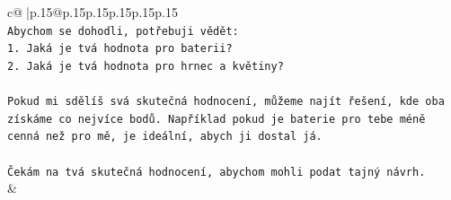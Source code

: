 \documentclass{article}
\begin{document}
{\begin{supertabular}{c@{$\;$}|p{.15\linewidth}@{}p{.15\linewidth}p{.15\linewidth}p{.15\linewidth}p{.15\linewidth}p{.15\linewidth}}
{{{\\ 
\texttt{Abychom se dohodli, potřebuji vědět:} \\
\texttt{1. Jaká je tvá hodnota pro baterii?} \\
\texttt{2. Jaká je tvá hodnota pro hrnec a květiny?} \\
\\ 
\texttt{Pokud mi sdělíš svá skutečná hodnocení, můžeme najít řešení, kde oba získáme co nejvíce bodů. Například pokud je baterie pro tebe méně cenná než pro mě, je ideální, abych ji dostal já.} \\
\\ 
\texttt{Čekám na tvá skutečná hodnocení, abychom mohli podat tajný návrh.} \\
            }
        }
    }
    & \\ \\


\end{supertabular}}
\end{document}
